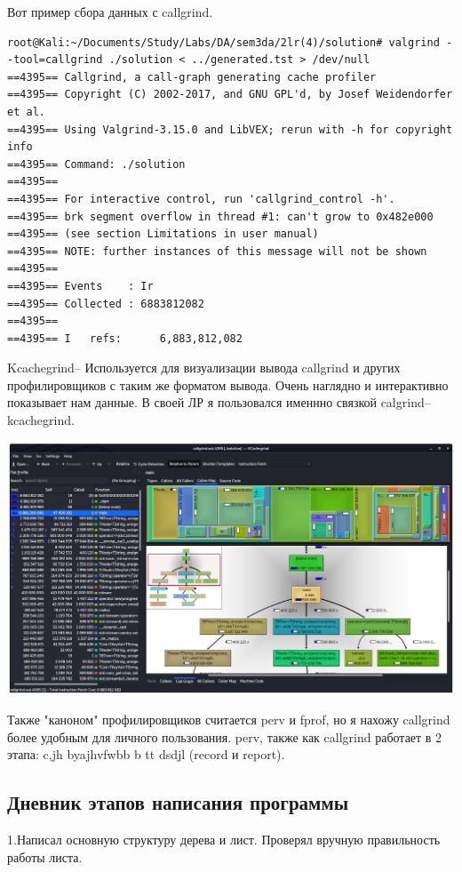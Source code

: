 \documentclass[12pt]{article}
\begin{document}
Вот пример сбора данных с callgrind. 

\begin{lstlisting}
root@Kali:~/Documents/Study/Labs/DA/sem3da/2lr(4)/solution# valgrind --tool=callgrind ./solution < ../generated.tst > /dev/null
==4395== Callgrind, a call-graph generating cache profiler
==4395== Copyright (C) 2002-2017, and GNU GPL'd, by Josef Weidendorfer et al.
==4395== Using Valgrind-3.15.0 and LibVEX; rerun with -h for copyright info
==4395== Command: ./solution
==4395== 
==4395== For interactive control, run 'callgrind_control -h'.
==4395== brk segment overflow in thread #1: can't grow to 0x482e000
==4395== (see section Limitations in user manual)
==4395== NOTE: further instances of this message will not be shown
==4395== 
==4395== Events    : Ir
==4395== Collected : 6883812082
==4395== 
==4395== I   refs:      6,883,812,082
\end{lstlisting}

Kcachegrind-- Используется для визуализации вывода callgrind и других профилировщиков с таким же форматом вывода. 
Очень наглядно и интерактивно показывает нам данные. В своей ЛР я пользовался именнно связкой calgrind--kcachegrind.

\includegraphics[width=\linewidth]{callgrind}

Также "каноном" профилировщиков считается perv и fprof, но я нахожу callgrind более удобным для личного пользования. perv, также как callgrind работает в 2 этапа: c,jh byajhvfwbb b tt dsdjl (record и report).

\subsection*{Дневник этапов написания программы}

1.Написал основную структуру дерева и лист. Проверял вручную правильность работы листа.
\end{document}
